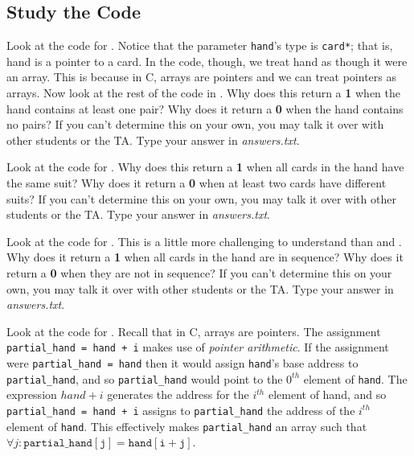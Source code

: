 \subsection{Study the Code}
\label{studyTheCode}

Look at the code for . Notice that the parameter
\lstinline{hand}'s type is \lstinline{card*}; that is, \lstinline{}{hand} is a
pointer to a \lstinline{}{card}. In the code, though, we treat
\lstinline{}{hand} as though it were an array. This is because in C, arrays are
pointers and we can treat pointers as arrays. Now look at the rest of the code
in . Why does this return a \textbf{1} when the hand
contains at least one pair?  Why does it return a \textbf{0} when the hand
contains no pairs?  If you can't determine this on your own, you may talk it
over with other students or the TA. Type your answer in \textit{answers.txt}.

Look at the code for . Why does this return a \textbf{1}
when all cards in the hand have the same suit?  Why does it return a \textbf{0}
when at least two cards have different suits?  If you can't determine this on
your own, you may talk it over with other students or the TA. Type your answer
in \textit{answers.txt}.

Look at the code for . This is a little more challenging
to understand than  and . Why does it
return a \textbf{1} when all cards in the hand are in sequence?  Why does it
return a \textbf{0} when they are not in sequence? If you can't determine this
on your own, you may talk it over with other students or the TA. Type your
answer in \textit{answers.txt}.

Look at the code for . Recall that in C, arrays are
pointers. The assignment \lstinline{partial_hand = hand + i} makes use of
\textit{pointer arithmetic}. If the assignment were
\lstinline{partial_hand = hand} then it would assign \lstinline{hand}'s base
address to \lstinline{partial_hand}, and so \lstinline{partial_hand} would point
to the $0^{th}$ element of \lstinline{hand}. The expression $hand+i$ generates
the address for the $i^{th}$ element of \lstinline{}{hand}, and so
\lstinline{partial_hand = hand + i} assigns to \lstinline{partial_hand} the
address of the $i^{th}$ element of \lstinline{hand}. This effectively makes
\lstinline{partial_hand} an array such that
$\forall j : \mathtt{partial\_hand[j] = hand[i+j]}$.

